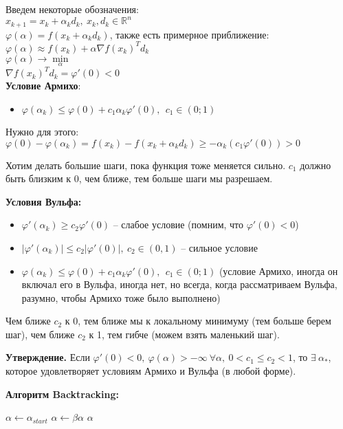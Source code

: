 Введем некоторые обозначения:\\
$x_{k+1} = x_k + \alpha_k d_k, \ x_k, d_k \in \mathbb{R}^n$\\
$\varphi(\alpha) = f(x_k + \alpha_k d_k)$, также есть примерное приближение: $\varphi(\alpha) \approx f(x_k) + \alpha \nabla f(x_k)^Td_k$\\
$\varphi(\alpha) \to \min\limits_{\alpha}$\\
$\nabla f(x_k)^Td_k = \varphi'(0) < 0$\\

\textbf{Условие Армихо}:
\begin{itemize}
    \item $\varphi(\alpha_k) \leq \varphi(0) + c_1\alpha_k\varphi'(0),\ \ c_1 \in (0; 1)$
\end{itemize}
Нужно для этого: $\varphi(0) - \varphi(\alpha_k) = f(x_k) - f(x_k + \alpha_k d_k)\geq -\alpha_k(c_1\varphi'(0))>0$

Хотим делать большие шаги, пока функция тоже меняется сильно. $c_1$ должно быть близким к 0, чем ближе, тем больше шаги мы разрешаем.
\bigskip

\textbf{Условия Вульфа:}
\begin{itemize}
    \item $\varphi'(\alpha_k) \geq c_2 \varphi'(0)$ -- слабое условие (помним, что $\varphi'(0) < 0$)
    \item $|\varphi'(\alpha_k)| \leq c_2 |\varphi'(0)|, \ c_2 \in (0, 1)$ -- сильное условие
    \item  $\varphi(\alpha_k) \leq \varphi(0) + c_1\alpha_k\varphi'(0),\ \ c_1 \in (0; 1)$ (условие Армихо, иногда он включал его в Вульфа, иногда нет, но всегда, когда рассматриваем Вульфа, разумно, чтобы Армихо тоже было выполнено)
\end{itemize}
Чем ближе $c_2$ к 0, тем ближе мы к локальному минимуму (тем больше берем шаг), чем ближе $c_2$ к 1, тем гибче (можем взять маленький шаг).
\bigskip

\textbf{Утверждение.} Если $\varphi'(0) < 0,\ \varphi(\alpha) > -\infty\ \forall \alpha,\ 0<c_1\leq c_2<1$, то $\exists\ \alpha_*$, которое удовлетворяет условиям Армихо и Вульфа (в любой форме).
\bigskip

\textbf{Алгоритм Backtracking:}
\begin{algorithm}[H]
    \begin{algorithmic}[1]
        \State $\alpha \gets \alpha_{start}$
            \State $\alpha \gets \beta\alpha$
        \EndWhile
        \State \Return $\alpha$
        \EndProcedure
    \end{algorithmic}
\end{algorithm}